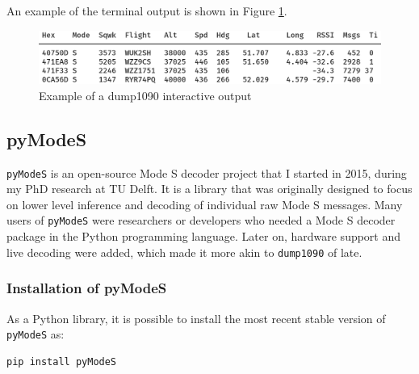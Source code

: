 An example of the terminal output is shown in Figure \ref{fig:dump1090}.

\begin{figure}[ht]
  \centering
  \includegraphics[scale=0.33]{figures/quickstart/dump1090.png}
  \caption{Example of a dump1090 interactive output}
  \label{fig:dump1090}
\end{figure}



  


\subsection{pyModeS}
\texttt{pyModeS} is an open-source Mode S decoder project that I started in 2015, during my PhD research at TU Delft. It is a library that was originally designed to focus on lower level inference and decoding of individual raw Mode S messages. Many users of \texttt{pyModeS} were researchers or developers who needed a Mode S decoder package in the Python programming language. Later on, hardware support and live decoding were added, which made it more akin to \texttt{dump1090} of late.


\subsubsection{Installation of pyModeS}

As a Python library, it is possible to install the most recent stable version of \texttt{pyModeS} as:

\begin{verbatim}
pip install pyModeS
\end{verbatim}

